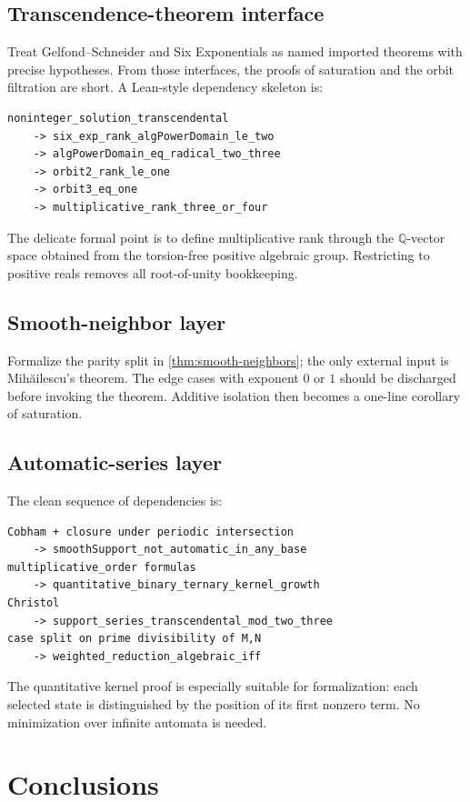 \documentclass[11pt]{article}
\theoremstyle{definition}
\newcommand{\Q}{\mathbb{Q}}
\begin{document}
\subsection{Transcendence-theorem interface}

Treat Gelfond--Schneider and Six Exponentials as named imported theorems with
precise hypotheses.  From those interfaces, the proofs of saturation and the
orbit filtration are short.  A Lean-style dependency skeleton is:
\begin{verbatim}
noninteger_solution_transcendental
    -> six_exp_rank_algPowerDomain_le_two
    -> algPowerDomain_eq_radical_two_three
    -> orbit2_rank_le_one
    -> orbit3_eq_one
    -> multiplicative_rank_three_or_four
\end{verbatim}
The delicate formal point is to define multiplicative rank through the
$\Q$-vector space obtained from the torsion-free positive algebraic group.
Restricting to positive reals removes all root-of-unity bookkeeping.

\subsection{Smooth-neighbor layer}

Formalize the parity split in \cref{thm:smooth-neighbors}; the only external
input is Mih\u{a}ilescu's theorem.  The edge cases with exponent $0$ or $1$
should be discharged before invoking the theorem.  Additive isolation then
becomes a one-line corollary of saturation.

\subsection{Automatic-series layer}

The clean sequence of dependencies is:
\begin{verbatim}
Cobham + closure under periodic intersection
    -> smoothSupport_not_automatic_in_any_base
multiplicative_order formulas
    -> quantitative_binary_ternary_kernel_growth
Christol
    -> support_series_transcendental_mod_two_three
case split on prime divisibility of M,N
    -> weighted_reduction_algebraic_iff
\end{verbatim}
The quantitative kernel proof is especially suitable for formalization: each
selected state is distinguished by the position of its first nonzero term.
No minimization over infinite automata is needed.

\section{Conclusions}
\end{document}

